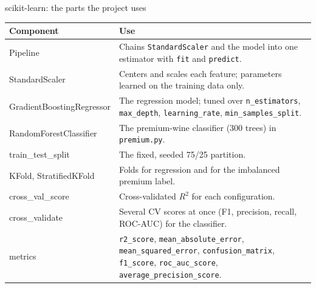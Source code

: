 \begin{frame}{scikit-learn: the parts the project uses}
\begingroup\footnotesize
\begin{tabularx}{\textwidth}{>{\ttfamily}l X}
\normalfont\bfseries Component & \bfseries Use \\
\toprule
Pipeline & Chains \texttt{StandardScaler} and the model into one estimator with \texttt{fit} and \texttt{predict}. \\
\addlinespace[0.25em]
StandardScaler & Centers and scales each feature; parameters learned on the training data only. \\
\addlinespace[0.25em]
GradientBoostingRegressor & The regression model; tuned over \texttt{n\_estimators}, \texttt{max\_depth}, \texttt{learning\_rate}, \texttt{min\_samples\_split}. \\
\addlinespace[0.25em]
RandomForestClassifier & The premium-wine classifier (300 trees) in \texttt{premium.py}. \\
\addlinespace[0.25em]
train\_test\_split & The fixed, seeded 75/25 partition. \\
\addlinespace[0.25em]
KFold, StratifiedKFold & Folds for regression and for the imbalanced premium label. \\
\addlinespace[0.25em]
cross\_val\_score & Cross-validated $R^2$ for each configuration. \\
\addlinespace[0.25em]
cross\_validate & Several CV scores at once (F1, precision, recall, ROC-AUC) for the classifier. \\
\addlinespace[0.25em]
metrics & \texttt{r2\_score}, \texttt{mean\_absolute\_error}, \texttt{mean\_squared\_error}, \texttt{confusion\_matrix}, \texttt{f1\_score}, \texttt{roc\_auc\_score}, \texttt{average\_precision\_score}. \\
\bottomrule
\end{tabularx}
\par\endgroup
\coursefooter
\end{frame}

